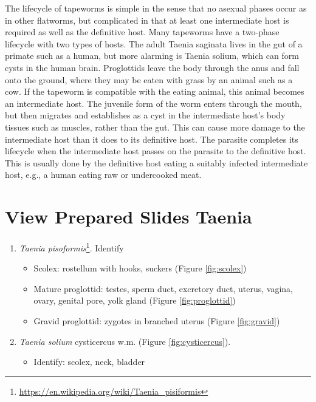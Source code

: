 \documentclass[]{book}
\providecommand{\tightlist}{%
  \setlength{\itemsep}{0pt}\setlength{\parskip}{0pt}}
\let\rmarkdownfootnote\footnote%
\def\footnote{\protect\rmarkdownfootnote}
\renewcommand{\href}[2]{#2\footnote{\url{#1}}}
\theoremstyle{definition}
\theoremstyle{definition}
\theoremstyle{definition}
\theoremstyle{remark}
\begin{document}
The lifecycle of tapeworms is simple in the sense that no asexual phases
occur as in other flatworms, but complicated in that at least one
intermediate host is required as well as the definitive host. Many
tapeworms have a two-phase lifecycle with two types of hosts. The adult
Taenia saginata lives in the gut of a primate such as a human, but more
alarming is Taenia solium, which can form cysts in the human brain.
Proglottids leave the body through the anus and fall onto the ground,
where they may be eaten with grass by an animal such as a cow. If the
tapeworm is compatible with the eating animal, this animal becomes an
intermediate host. The juvenile form of the worm enters through the
mouth, but then migrates and establishes as a cyst in the intermediate
host's body tissues such as muscles, rather than the gut. This can cause
more damage to the intermediate host than it does to its definitive
host. The parasite completes its lifecycle when the intermediate host
passes on the parasite to the definitive host. This is usually done by
the definitive host eating a suitably infected intermediate host, e.g.,
a human eating raw or undercooked meat.

\section{View Prepared Slides Taenia}\label{view-prepared-slides-taenia}

\begin{enumerate}
\def\labelenumi{\arabic{enumi}.}
\tightlist
\item
  \href{https://en.wikipedia.org/wiki/Taenia_pisiformis}{\emph{Taenia
  pisoformis}}. Identify

  \begin{itemize}
  \tightlist
  \item
    Scolex: rostellum with hooks, suckers (Figure \ref{fig:scolex})
  \item
    Mature proglottid: testes, sperm duct, excretory duct, uterus,
    vagina, ovary, genital pore, yolk gland (Figure
    \ref{fig:proglottid})
  \item
    Gravid proglottid: zygotes in branched uterus (Figure
    \ref{fig:gravid})
  \end{itemize}
\item
  \emph{Taenia solium} cysticercus w.m. (Figure \ref{fig:cysticercus}).

  \begin{itemize}
  \tightlist
  \item
    Identify: scolex, neck, bladder
  \end{itemize}
\end{enumerate}
\end{document}
